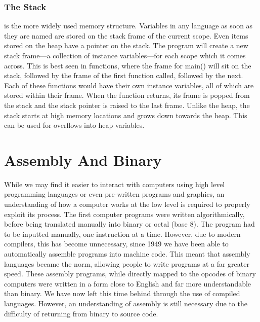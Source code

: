 \documentclass[a4paper,11pt]{book}
\begin{document}
					\subsubsection{The Stack}
						is the more widely used memory structure. 
						Variables in any language as soon as they are named are stored on the stack frame of the current scope. 
						Even items stored on the heap have a pointer on the stack. 
						The program will create a new stack frame---a collection of instance variables---for each scope which it comes across. 
						This is best seen in functions, where the frame for main() will sit on the stack, followed by the frame of the first function called, followed by the next. 
						Each of these functions would have their own instance variables, all of which are stored within their frame. 
						When the function returns, its frame is popped from the stack and the stack pointer is raised to the last frame. 
						Unlike the heap, the stack starts at high memory locations and grows down towards the heap. 
						This can be used for overflows into heap variables. 

	\section{Assembly And Binary}
		While we may find it easier to interact with computers using high level programming languages or even pre-written programs and graphics, an understanding of how a computer works at the low level is required to properly exploit its process. 
		The first computer programs were written algorithmically, before being translated manually into binary or octal (base 8). 
		The program had to be inputted manually, one instruction at a time. 
		However, due to modern compilers, this has become unnecessary, since 1949 we have been able to automatically assemble programs into machine code. 
		This meant that assembly languages became the norm, allowing people to write programs at a far greater speed.
		These assembly programs, while directly mapped to the opcodes of binary computers were written in a form close to English and far more understandable than binary. 
		We have now left this time behind through the use of compiled languages. 
		However, an understanding of assembly is still necessary due to the difficulty of returning from binary to source code. 
\end{document}
